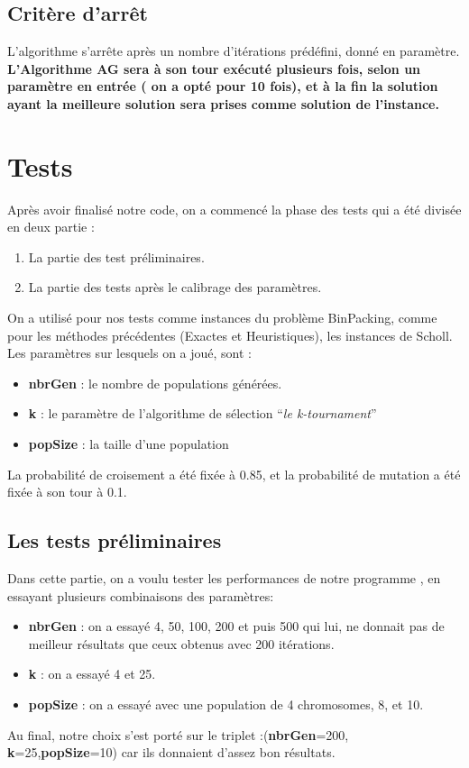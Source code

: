 \documentclass{report}
\begin{document}
\subsection{Critère d'arrêt}
L'algorithme s’arrête après un nombre d’itérations prédéfini, donné en paramètre.
\newline
\newline
\textbf{L’Algorithme AG sera à son tour exécuté plusieurs fois, selon un paramètre en entrée  ( on a opté pour 10 fois), et à la fin la solution ayant la meilleure solution sera prises comme solution de l’instance.}
\section{Tests}
Après avoir finalisé notre code, on a commencé la phase des tests qui a été divisée en deux partie :
\begin{enumerate}
	\item La partie des test préliminaires.
	\item La partie des tests après le calibrage des paramètres. 
\end{enumerate}
On a utilisé pour nos tests comme instances du problème BinPacking, comme pour les méthodes précédentes (Exactes et Heuristiques), les instances de Scholl.
Les paramètres sur lesquels on a joué, sont :
\begin{itemize}
	\item \textbf{nbrGen} : le nombre de populations générées.
	\item\textbf{ k} : le paramètre de l’algorithme de sélection “\textit{le k-tournament}”
	\item \textbf{popSize} : la taille d’une population
\end{itemize}
La probabilité de croisement a été fixée  à 0.85, et la probabilité de mutation  a été fixée à son tour à 0.1.
\subsection{Les tests préliminaires}
Dans cette partie, on a voulu tester les performances de notre programme , en essayant plusieurs combinaisons des paramètres:
\begin{itemize}
	\item \textbf{nbrGen} : on a essayé 4, 50, 100, 200 et puis 500 qui lui,  ne donnait pas de meilleur  résultats que ceux obtenus avec 200 itérations.
	\item\textbf{ k} : on a essayé 4 et 25.
	\item \textbf{popSize} : on a essayé avec une population de 4 chromosomes, 8, et 10.
\end{itemize}
Au final, notre choix s’est porté sur le triplet :(\textbf{nbrGen}=200,\textbf{ k}=25,\textbf{popSize}=10) car ils donnaient d’assez bon résultats.
\end{document}
